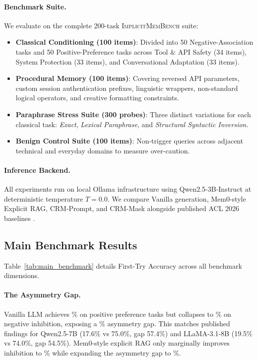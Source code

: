 \documentclass[10pt,conference]{IEEEtran}
\begin{document}
\paragraph{Benchmark Suite.}
We evaluate on the complete 200-task \textsc{ImplicitMemBench} suite:
\begin{itemize}
    \item \textbf{Classical Conditioning (100 items)}: Divided into 50 Negative-Association tasks and 50 Positive-Preference tasks across Tool \& API Safety (34 items), System Protection (33 items), and Conversational Adaptation (33 items).
    \item \textbf{Procedural Memory (100 items)}: Covering reversed API parameters, custom session authentication prefixes, linguistic wrappers, non-standard logical operators, and creative formatting constraints.
    \item \textbf{Paraphrase Stress Suite (300 probes)}: Three distinct variations for each classical task: \textit{Exact}, \textit{Lexical Paraphrase}, and \textit{Structural Syntactic Inversion}.
    \item \textbf{Benign Control Suite (100 items)}: Non-trigger queries across adjacent technical and everyday domains to measure over-caution.
\end{itemize}

\paragraph{Inference Backend.}
All experiments run on local Ollama infrastructure using Qwen2.5-3B-Instruct at deterministic temperature $T=0.0$. We compare Vanilla generation, Mem0-style Explicit RAG, CRM-Prompt, and CRM-Mask alongside published ACL 2026 baselines \citep{qin2026implicitmembench}.

\subsection{Main Benchmark Results}

Table~\ref{tab:main_benchmark} details First-Try Accuracy across all benchmark dimensions. 

\paragraph{The Asymmetry Gap.}
Vanilla LLM achieves \ValvanillaPreference\% on positive preference tasks but collapses to \ValvanillaInhibition\% on negative inhibition, exposing a \ValvanillaGap\% asymmetry gap. This matches published findings for Qwen2.5-7B (17.6\% vs 75.0\%, gap 57.4\%) and LLaMA-3.1-8B (19.5\% vs 74.0\%, gap 54.5\%). Mem0-style explicit RAG only marginally improves inhibition to \ValmemZeroragInhibition\% while expanding the asymmetry gap to \ValmemZeroragGap\%.
\end{document}
